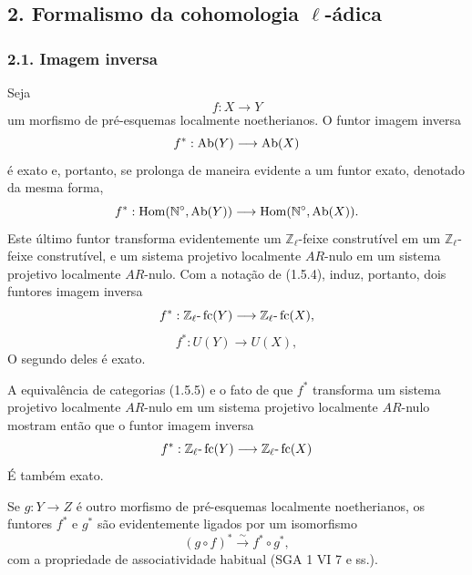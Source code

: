 \subsection*{2. Formalismo da cohomologia \(\ell\)-ádica}

\subsubsection*{2.1. Imagem inversa}

Seja
\[
f:X\longrightarrow Y
\]
um morfismo de pré-esquemas localmente noetherianos. O funtor imagem inversa
\[
f^*:\operatorname{Ab}(Y)\longrightarrow \operatorname{Ab}(X)
\]
é exato e, portanto, se prolonga de maneira evidente a um funtor exato, denotado da mesma forma,
\[
f^*:\operatorname{Hom}(\mathbb N^\circ,\operatorname{Ab}(Y))\longrightarrow \operatorname{Hom}(\mathbb N^\circ,\operatorname{Ab}(X)).
\]
Este último funtor transforma evidentemente um \(\mathbb Z_\ell\)-feixe construtível em um \(\mathbb Z_\ell\)-feixe construtível, e um sistema projetivo localmente \(AR\)-nulo em um sistema projetivo localmente \(AR\)-nulo. Com a notação de (1.5.4), induz, portanto, dois funtores imagem inversa
\[
f^*:\mathbb Z_\ell\text{-}\operatorname{fc}(Y)\longrightarrow \mathbb Z_\ell\text{-}\operatorname{fc}(X),
\]
\[
f^*:U(Y)\longrightarrow U(X),
\]
O segundo deles é exato.

A equivalência de categorias (1.5.5) e o fato de que \(f^*\) transforma um sistema projetivo localmente \(AR\)-nulo em um sistema projetivo localmente \(AR\)-nulo mostram então que o funtor imagem inversa
\[
f^*:\mathbb Z_\ell\text{-}\operatorname{fc}(Y)\longrightarrow \mathbb Z_\ell\text{-}\operatorname{fc}(X)
\]
É também exato.

Se \(g:Y\to Z\) é outro morfismo de pré-esquemas localmente noetherianos, os funtores \(f^*\) e \(g^*\) são evidentemente ligados por um isomorfismo
\[
(g\circ f)^*\xrightarrow{\sim}f^*\circ g^*,
\]
com a propriedade de associatividade habitual (SGA 1 VI 7 e ss.).
